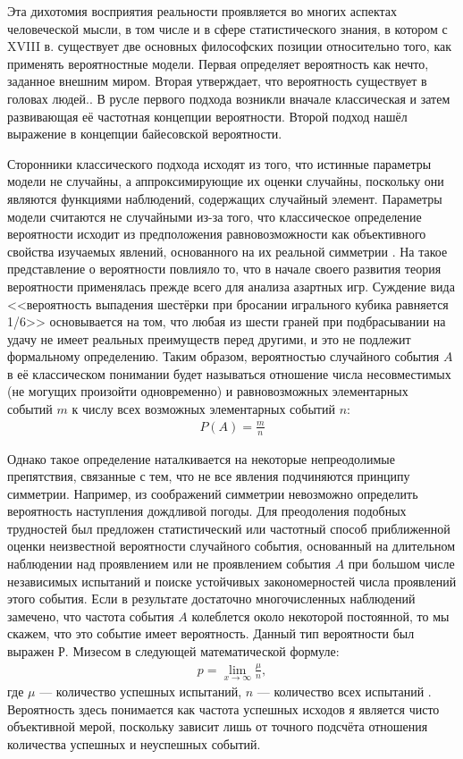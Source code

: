 Эта дихотомия восприятия реальности проявляется во многих аспектах человеческой мысли, в том числе и в сфере статистического знания, в котором с XVIII в. существует две основных философских позиции относительно того, как применять вероятностные модели. Первая определяет вероятность как нечто, заданное внешним миром. Вторая утверждает, что вероятность существует в головах людей.\cite[стр. 18]{Christensen2010}. В русле первого подхода возникли вначале классическая и затем развивающая её частотная концепции вероятности. Второй подход нашёл выражение в концепции байесовской вероятности.

Сторонники классического подхода исходят из того, что истинные параметры модели не случайны, а аппроксимирующие их оценки случайны, поскольку они являются функциями наблюдений, содержащих случайный элемент. \cite[стр. 5-6]{Zellner1980} Параметры модели считаются не случайными из-за того, что классическое определение вероятности исходит из предположения равновозможности как объективного свойства изучаемых явлений, основанного на их реальной симметрии \cite[стр. 24]{Gnedenko2005}. На такое представление о вероятности повлияло то, что в начале своего развития теория вероятности применялась прежде всего для анализа азартных игр. Суждение вида <<вероятность выпадения шестёрки при бросании игрального кубика равняется 1/6>> основывается на том, что любая из шести граней при подбрасывании на удачу не имеет реальных преимуществ перед другими, и это не подлежит формальному определению. Таким образом, вероятностью случайного события $A$ в её классическом понимании будет называться отношение числа несовместимых (не могущих произойти одновременно) и равновозможных элементарных событий $m$ к числу всех возможных элементарных событий $n$:
\begin{eqnarray}
P(A)=\frac{m}{n}
\end{eqnarray}

Однако такое определение наталкивается на некоторые непреодолимые препятствия, связанные с тем, что не все явления подчиняются принципу симметрии. Например, из соображений симметрии невозможно определить вероятность наступления дождливой погоды. Для преодоления подобных трудностей был предложен статистический или частотный способ приближенной оценки неизвестной вероятности случайного события, основанный на длительном наблюдении над проявлением или не проявлением события $A$ при большом числе независимых испытаний и поиске устойчивых закономерностей числа проявлений этого события. Если в результате достаточно многочисленных наблюдений замечено, что частота события $A$ колеблется около некоторой постоянной, то мы скажем, что это событие имеет вероятность. Данный тип вероятности был выражен Р. Мизесом в следующей математической формуле:
\begin{eqnarray}
p=\lim_{x\to\infty}\frac{\mu}{n},
\end{eqnarray}
где $\mu$ --- количество успешных испытаний, $n$ --- количество всех испытаний \cite[стр. 46-47]{Gnedenko2005}. Вероятность здесь понимается как частота успешных исходов я является чисто объективной мерой, поскольку зависит лишь от точного подсчёта отношения количества успешных и неуспешных событий. 

